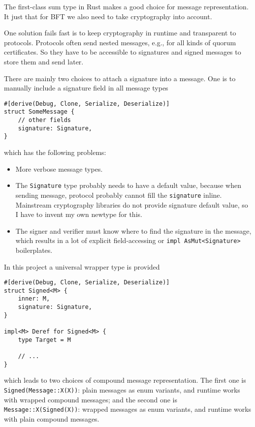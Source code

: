 \documentclass[acmsmall, nonacm, screen]{acmart}
\begin{document}
The first-class sum type in Rust makes a good choice for message representation.
It just that for BFT we also need to take cryptography into account.

One solution fails fast is to keep cryptography in runtime and transparent to protocols.
Protocols often send nested messages, e.g., for all kinds of quorum certificates.
So they have to be accessible to signatures and signed messages to store them and send later.

There are mainly two choices to attach a signature into a message.
One is to manually include a signature field in all message types

\begin{verbatim}
#[derive(Debug, Clone, Serialize, Deserialize)]
struct SomeMessage {
    // other fields
    signature: Signature,
}
\end{verbatim}

\noindent which has the following problems:
\begin{itemize}
    \item More verbose message types.
    \item The \texttt{Signature} type probably needs to have a default value, because when sending message, protocol probably cannot fill the \texttt{signature} inline.
    Mainstream cryptography libraries do not provide signature default value, so I have to invent my own newtype for this.
    \item The signer and verifier must know where to find the signature in the message, which results in a lot of explicit field-accessing or \texttt{impl AsMut<Signature>} boilerplates.
\end{itemize}

In this project a universal wrapper type is provided

\begin{verbatim}
#[derive(Debug, Clone, Serialize, Deserialize)]
struct Signed<M> {
    inner: M,
    signature: Signature,
}

impl<M> Deref for Signed<M> {
    type Target = M

    // ...
}
\end{verbatim}

\noindent which leads to two choices of compound message representation.
The first one is \texttt{Signed(Message::X(X))}: plain messages as enum variants, and runtime works with wrapped compound messages; and the second one is \texttt{Message::X(Signed(X))}: wrapped messages as enum variants, and runtime works with plain compound messages.
\end{document}

